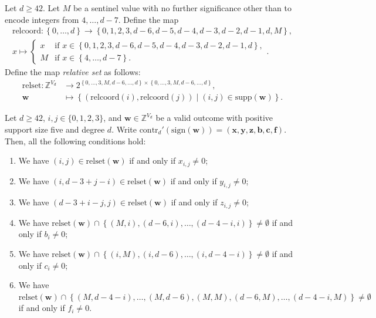 \begin{definition}
    Let \( d \geq 42 \).
    Let \( M \) be a sentinel value with no further significance other than to encode integers from \( 4, \dots, d-7 \). Define the map 
    \begin{align*}
        \mathrm{relcoord}: \left\{ 0, \dots, d \right\} \to \left\{ 0,1,2,3,d-6,d-5,d-4,d-3,d-2,d-1,d,M \right\}, \\
        x \mapsto \begin{cases}
            x & \text{if } x \in \left\{ 0,1,2,3, d-6,d-5,d-4,d-3,d-2,d-1,d \right\}, \\
            M& \text{if } x \in \left\{ 4, \dots, d-7 \right\}.
        \end{cases}.
    \end{align*}
    Define the map \emph{relative set} as follows:
    \begin{align*}
        \mathrm{relset}: \mathbb{Z}^{V_d} &\to 2^{\left\{ 0, \dots, 3, M, d-6, \dots, d \right\} \times \left\{ 0, \dots, 3, M, d-6, \dots, d \right\}}, \\
        \mathbf{w} &\mapsto \left\{ (\mathrm{relcoord}(i), \mathrm{relcoord}(j)) \mid (i,j) \in \mathrm{supp}(\mathbf{w}) \right\}.
    \end{align*}
\end{definition}

\begin{proposition}\label{prop:iewjri3j3234212121112}
    Let \( d \geq 42 \), \( i,j \in \{ 0,1,2,3 \} \), and \( \mathbf{w} \in \mathbb{Z}^{V_d} \) be a valid outcome with positive support size five and degree \( d \). Write \( \mathrm{contr}_d'(\mathrm{sign}(\mathbf{w})) = (\mathbf{x},\mathbf{y},\mathbf{z},\mathbf{b},\mathbf{c},\mathbf{f} ) \). Then, all the following conditions hold:
    \begin{enumerate}
        \item We have \( (i,j) \in \mathrm{relset}(\mathbf{w}) \) if and only if \( x_{i,j} \neq 0 \);
        \item We have \( (i, d-3+j-i) \in \mathrm{relset}(\mathbf{w}) \) if and only if \( y_{i,j} \neq 0 \);
        \item We have \( (d-3+i-j,j) \in \mathrm{relset}(\mathbf{w}) \) if and only if \( z_{i,j} \neq 0 \);
        \item We have \( \mathrm{relset}(\mathbf{w}) \cap \left\{ (M,i), (d-6, i), \dots, (d-4-i, i) \right\} \neq \emptyset \) if and only if \( b_i \neq 0 \);
        \item We have \( \mathrm{relset}(\mathbf{w}) \cap \left\{ (i,M), (i, d-6), \dots, (i,d-4-i) \right\} \neq \emptyset \) if and only if \( c_i \neq 0 \);
        \item We have \( \mathrm{relset}(\mathbf{w}) \cap \left\{ (M, d-4-i), \dots, (M, d-6), (M,M), (d-6, M), \dots, (d-4-i, M) \right\} \neq \emptyset \) if and only if \( f_i \neq 0 \).
    \end{enumerate}
\end{proposition}

